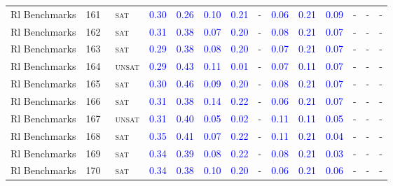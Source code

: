 \begin{center}
{\begin{longtable}{@{}llllllllllllll@{}}
Rl Benchmarks & 161 & ~\textsc{sat} & \textcolor{blue}{0.30} & \textcolor{blue}{0.26} & \textcolor{blue}{0.10} & \textcolor{blue}{0.21} & - & \textcolor{blue}{0.06} & \textcolor{blue}{0.21} & \textcolor{blue}{0.09} & - & - & - \\
Rl Benchmarks & 162 & ~\textsc{sat} & \textcolor{blue}{0.31} & \textcolor{blue}{0.38} & \textcolor{blue}{0.07} & \textcolor{blue}{0.20} & - & \textcolor{blue}{0.08} & \textcolor{blue}{0.21} & \textcolor{blue}{0.07} & - & - & - \\
Rl Benchmarks & 163 & ~\textsc{sat} & \textcolor{blue}{0.29} & \textcolor{blue}{0.38} & \textcolor{blue}{0.08} & \textcolor{blue}{0.20} & - & \textcolor{blue}{0.07} & \textcolor{blue}{0.21} & \textcolor{blue}{0.07} & - & - & - \\
Rl Benchmarks & 164 & ~\textsc{unsat} & \textcolor{blue}{0.29} & \textcolor{blue}{0.43} & \textcolor{blue}{0.11} & \textcolor{blue}{0.01} & - & \textcolor{blue}{0.07} & \textcolor{blue}{0.11} & \textcolor{blue}{0.07} & - & - & - \\
Rl Benchmarks & 165 & ~\textsc{sat} & \textcolor{blue}{0.30} & \textcolor{blue}{0.46} & \textcolor{blue}{0.09} & \textcolor{blue}{0.20} & - & \textcolor{blue}{0.08} & \textcolor{blue}{0.21} & \textcolor{blue}{0.07} & - & - & - \\
Rl Benchmarks & 166 & ~\textsc{sat} & \textcolor{blue}{0.31} & \textcolor{blue}{0.38} & \textcolor{blue}{0.14} & \textcolor{blue}{0.22} & - & \textcolor{blue}{0.06} & \textcolor{blue}{0.21} & \textcolor{blue}{0.07} & - & - & - \\
Rl Benchmarks & 167 & ~\textsc{unsat} & \textcolor{blue}{0.31} & \textcolor{blue}{0.40} & \textcolor{blue}{0.05} & \textcolor{blue}{0.02} & - & \textcolor{blue}{0.11} & \textcolor{blue}{0.11} & \textcolor{blue}{0.05} & - & - & - \\
Rl Benchmarks & 168 & ~\textsc{sat} & \textcolor{blue}{0.35} & \textcolor{blue}{0.41} & \textcolor{blue}{0.07} & \textcolor{blue}{0.22} & - & \textcolor{blue}{0.11} & \textcolor{blue}{0.21} & \textcolor{blue}{0.04} & - & - & - \\
Rl Benchmarks & 169 & ~\textsc{sat} & \textcolor{blue}{0.34} & \textcolor{blue}{0.39} & \textcolor{blue}{0.08} & \textcolor{blue}{0.22} & - & \textcolor{blue}{0.08} & \textcolor{blue}{0.21} & \textcolor{blue}{0.03} & - & - & - \\
Rl Benchmarks & 170 & ~\textsc{sat} & \textcolor{blue}{0.34} & \textcolor{blue}{0.38} & \textcolor{blue}{0.10} & \textcolor{blue}{0.20} & - & \textcolor{blue}{0.06} & \textcolor{blue}{0.21} & \textcolor{blue}{0.06} & - & - & - \\

\end{longtable}}
\end{center}
